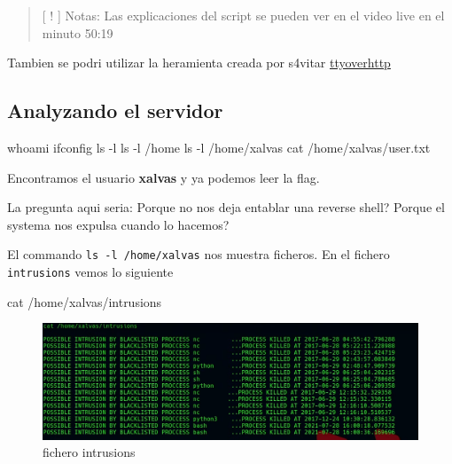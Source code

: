 \documentclass{assets/ipesethesis}
\newenvironment{Shaded}{\begin{snugshade}}{\end{snugshade}}
\newcommand{\ExtensionTok}[1]{#1}
\newcommand{\FunctionTok}[1]{\textcolor[rgb]{0.00,0.00,0.00}{#1}}
\newcommand{\NormalTok}[1]{#1}
\begin{document}
\begin{quote}
{[} ! {]} Notas: Las explicaciones del script se pueden ver en el video live en el minuto 50:19
\end{quote}

Tambien se podri utilizar la heramienta creada por s4vitar \href{https://github.com/s4vitar/ttyoverhttp}{ttyoverhttp}

\hypertarget{analyzando-el-servidor}{%
\subsection*{Analyzando el servidor}\label{analyzando-el-servidor}}

\begin{Shaded}
\begin{Highlighting}[]
\FunctionTok{whoami}
\ExtensionTok{ifconfig}
\FunctionTok{ls}\NormalTok{ -l}
\FunctionTok{ls}\NormalTok{ -l /home}
\FunctionTok{ls}\NormalTok{ -l /home/xalvas}
\FunctionTok{cat}\NormalTok{ /home/xalvas/user.txt}
\end{Highlighting}
\end{Shaded}

Encontramos el usuario \textbf{xalvas} y ya podemos leer la flag.

La pregunta aqui seria: Porque no nos deja entablar una reverse shell? Porque el systema nos expulsa cuando lo hacemos?

El commando \texttt{ls\ -l\ /home/xalvas} nos muestra ficheros. En el fichero \texttt{intrusions} vemos lo siguiente

\begin{Shaded}
\begin{Highlighting}[]
\FunctionTok{cat}\NormalTok{ /home/xalvas/intrusions}
\end{Highlighting}
\end{Shaded}

\begin{figure}
\includegraphics[width=0.9\linewidth]{images/calamity-intrusions} \caption{fichero intrusions}\label{fig:unnamed-chunk-11}
\end{figure}
\end{document}
